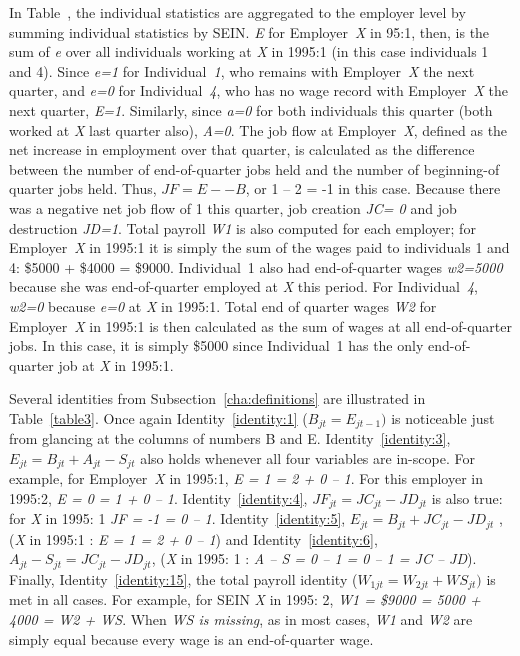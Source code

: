

In Table~, the individual statistics are aggregated to the
employer level by summing individual statistics by SEIN. \textit{E} for
Employer~\textit{X} in 95:1, then, is the sum of \textit{e} over all
individuals working at \textit{X} in 1995:1 (in this case individuals 1 and
4). Since \textit{e=1} for Individual~\textit{1}, who remains with
Employer~\textit{X} the next quarter, and \textit{e=0} for
Individual~\textit{4}, who has no wage record with Employer~\textit{X} the
next quarter, \textit{E=1}. Similarly, since \textit{a=0} for both
individuals this quarter (both worked at \textit{X} last quarter also),
\textit{A=0}. The job flow at Employer~\textit{X}, defined
as the net increase in employment over that quarter, is calculated as the
difference between the number of end-of-quarter jobs held and the number of
beginning-of quarter jobs held. Thus, $JF = E -- B$, or 1 -- 2 = -1 in this
case. Because there was a negative net job flow of 1 this quarter, job
creation \textit{JC= 0} and job destruction \textit{JD=1}. Total payroll \textit{W1} is also computed
for each employer; for Employer~\textit{X} in 1995:1 it is simply the sum
of the wages paid to individuals 1 and 4: {\$}5000 + {\$}4000 = {\$}9000.
Individual~1 also had end-of-quarter wages \textit{w2=5000} because she was
end-of-quarter employed at \textit{X} this period. For
Individual~\textit{4}, \textit{w2=0} because \textit{e=0} at \textit{X} in
1995:1. Total end of quarter wages \textit{W2} for Employer~\textit{X} in
1995:1 is then calculated as the sum of wages at all end-of-quarter jobs.
In this case, it is simply {\$}5000 since Individual~1 has the only
end-of-quarter job at \textit{X} in 1995:1.



Several identities from Subsection~\ref{cha:definitions} are illustrated in
Table~\ref{table3}.  Once again Identity~\ref{identity:1} ($B_{jt} = E_{jt
  - 1} )$ is noticeable just from glancing at the columns of numbers B and
E.  Identity~\ref{identity:3}, $E_{jt} = B_{jt} + A_{jt} - S_{jt} $ also
holds whenever all four variables are in-scope. For example, for
Employer~\textit{X} in 1995:1, \textit{E = 1 = 2 + 0 -- 1}. For this
employer in 1995:2, \textit{E = 0 = 1 + 0 -- 1}. Identity~\ref{identity:4},
$JF_{jt} = JC_{jt} - JD_{jt}$ is also true: for \textit{X} in 1995: 1
\textit{JF = -1 = 0 -- 1}. Identity~\ref{identity:5}, $E_{jt} = B_{jt} +
JC_{jt} - JD_{jt} $ , (\textit{X} in 1995:1 : \textit{E = 1 = 2 + 0 -- 1})
and Identity~\ref{identity:6}, $A_{jt} - S_{jt} = JC_{jt} - JD_{jt} $,
(\textit{X} in 1995: 1 : \textit{A -- S = 0 -- 1 = 0 -- 1 = JC -- JD}).
Finally, Identity~\ref{identity:15}, the total payroll identity ($W_{1jt} =
W_{2jt} + WS_{jt} )$ is met in all cases. For example, for SEIN \textit{X}
in 1995: 2, \textit{W1 = {\$}9000 = 5000 + 4000 = W2 + WS}. When \textit{WS
  is missing}, as in most cases, \textit{W1} and \textit{W2} are simply
equal because every wage is an end-of-quarter wage.

